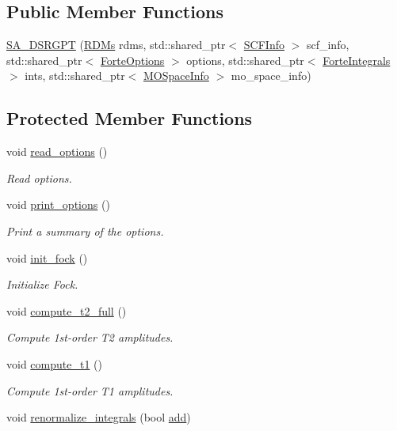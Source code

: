 \subsection*{Public Member Functions}
\begin{DoxyCompactItemize}
\item 
\mbox{\hyperlink{classforte_1_1_s_a___d_s_r_g_p_t_af0af14d8ef3121e75d040c6f88534f74}{S\+A\+\_\+\+D\+S\+R\+G\+PT}} (\mbox{\hyperlink{classforte_1_1_r_d_ms}{R\+D\+Ms}} rdms, std\+::shared\+\_\+ptr$<$ \mbox{\hyperlink{classforte_1_1_s_c_f_info}{S\+C\+F\+Info}} $>$ scf\+\_\+info, std\+::shared\+\_\+ptr$<$ \mbox{\hyperlink{classforte_1_1_forte_options}{Forte\+Options}} $>$ options, std\+::shared\+\_\+ptr$<$ \mbox{\hyperlink{classforte_1_1_forte_integrals}{Forte\+Integrals}} $>$ ints, std\+::shared\+\_\+ptr$<$ \mbox{\hyperlink{classforte_1_1_m_o_space_info}{M\+O\+Space\+Info}} $>$ mo\+\_\+space\+\_\+info)
\end{DoxyCompactItemize}
\subsection*{Protected Member Functions}
\begin{DoxyCompactItemize}
\item 
void \mbox{\hyperlink{classforte_1_1_s_a___d_s_r_g_p_t_afc8321ecaad6e4ff24da4b2ebd821a64}{read\+\_\+options}} ()
\begin{DoxyCompactList}\small\item\em Read options. \end{DoxyCompactList}\item 
void \mbox{\hyperlink{classforte_1_1_s_a___d_s_r_g_p_t_ab1735a16f39feefc4f005cba09b548de}{print\+\_\+options}} ()
\begin{DoxyCompactList}\small\item\em Print a summary of the options. \end{DoxyCompactList}\item 
void \mbox{\hyperlink{classforte_1_1_s_a___d_s_r_g_p_t_ab6265bf06c56c5f217df62f5e8c01a0a}{init\+\_\+fock}} ()
\begin{DoxyCompactList}\small\item\em Initialize Fock. \end{DoxyCompactList}\item 
void \mbox{\hyperlink{classforte_1_1_s_a___d_s_r_g_p_t_aa16723bbbf45d00778d0a6a489a20725}{compute\+\_\+t2\+\_\+full}} ()
\begin{DoxyCompactList}\small\item\em Compute 1st-\/order T2 amplitudes. \end{DoxyCompactList}\item 
void \mbox{\hyperlink{classforte_1_1_s_a___d_s_r_g_p_t_aa413fe4e9fa405623791303f9363e55b}{compute\+\_\+t1}} ()
\begin{DoxyCompactList}\small\item\em Compute 1st-\/order T1 amplitudes. \end{DoxyCompactList}\item 
void \mbox{\hyperlink{classforte_1_1_s_a___d_s_r_g_p_t_aea36c12ac2d0acc5fad43ad05e6cae9b}{renormalize\+\_\+integrals}} (bool \mbox{\hyperlink{namespaceforte_aaa15ba3048914f75527569dad1866895}{add}})
\end{DoxyCompactItemize}

